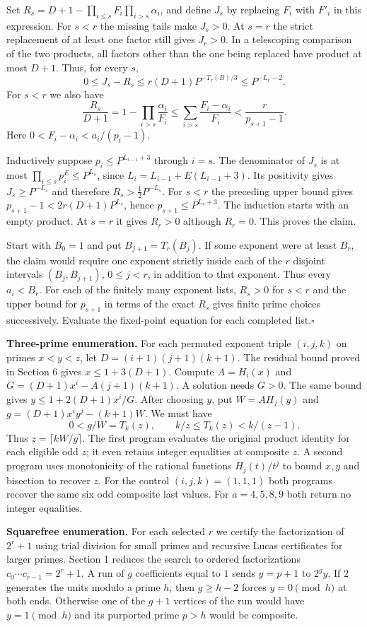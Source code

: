 \documentclass[12pt,letterpaper]{article}
\newcommand{\hd}[1]{\par\vspace{3pt}{\large\sffamily\bfseries\color{teal} #1}\par}
\newcommand{\thm}[1]{\textbf{\color{ink}#1.}\enspace}
\newcommand{\qedx}{\hfill\(\square\)}
\begin{document}
Set $R_s=D+1-\prod_{i\le s}F_i\prod_{i>s}\alpha_i$, and define $J_s$ by replacing $F_i$ with $F'_i$ in this expression. For $s<r$ the missing tails make $J_s>0$. At $s=r$ the strict replacement of at least one factor still gives $J_r>0$. In a telescoping comparison of the two products, all factors other than the one being replaced have product at most $D+1$. Thus, for every $s$,
\[
0\le J_s-R_s\le r(D+1)P^{-T_r(B)/3}\le P^{-L_r-2}.
\]
For $s<r$ we also have
\[
\frac{R_s}{D+1}=1-\prod_{i>s}\frac{\alpha_i}{F_i}
\le\sum_{i>s}\frac{F_i-\alpha_i}{F_i}<\frac{r}{p_{s+1}-1}.
\]
Here $0<F_i-\alpha_i<a_i/(p_i-1)$.

Inductively suppose $p_i\le P^{L_{i-1}+3}$ through $i=s$. The denominator of $J_s$ is at most $\prod_{i\le s}p_i^E\le P^{L_s}$, since $L_i=L_{i-1}+E(L_{i-1}+3)$. Its positivity gives $J_s\ge P^{-L_s}$ and therefore $R_s>\frac12P^{-L_s}$. For $s<r$ the preceding upper bound gives $p_{s+1}-1<2r(D+1)P^{L_s}$, hence $p_{s+1}\le P^{L_s+3}$. The induction starts with an empty product. At $s=r$ it gives $R_r>0$ although $R_r=0$. This proves the claim.

Start with $B_0=1$ and put $B_{j+1}=T_r(B_j)$. If some exponent were at least $B_r$, the claim would require one exponent strictly inside each of the $r$ disjoint intervals $(B_j,B_{j+1})$, $0\le j<r$, in addition to that exponent. Thus every $a_i<B_r$. For each of the finitely many exponent lists, $R_s>0$ for $s<r$ and the upper bound for $p_{s+1}$ in terms of the exact $R_s$ gives finite prime choices successively. Evaluate the fixed-point equation for each completed list.\qedx
\newpage
\hd{7\quad Reproducing the finite checks}
\thm{Three-prime enumeration} For each permuted exponent triple $(i,j,k)$ on primes $x<y<z$, let $D=(i+1)(j+1)(k+1)$. The residual bound proved in Section 6 gives $x\le1+3(D+1)$. Compute $A=H_i(x)$ and $G=(D+1)x^i-A(j+1)(k+1)$. A solution needs $G>0$. The same bound gives $y\le1+2(D+1)x^i/G$. After choosing $y$, put $W=AH_j(y)$ and $g=(D+1)x^i y^j-(k+1)W$. We must have
\[
0<g/W=T_k(z),\qquad k/z\le T_k(z)<k/(z-1).
\]
Thus $z=\lceil kW/g\rceil$. The first program evaluates the original product identity for each eligible odd $z$; it even retains integer equalities at composite $z$. A second program uses monotonicity of the rational functions $H_j(t)/t^j$ to bound $x,y$ and bisection to recover $z$. For the control $(i,j,k)=(1,1,1)$ both programs recover the same six odd composite last values. For $a=4,5,8,9$ both return no integer equalities.

\thm{Squarefree enumeration} For each selected $r$ we certify the factorization of $2^r+1$ using trial division for small primes and recursive Lucas certificates for larger primes. Section 1 reduces the search to ordered factorizations $c_0\cdots c_{r-1}=2^r+1$. A run of $g$ coefficients equal to $1$ sends $y=p+1$ to $2^g y$. If $2$ generates the units modulo a prime $h$, then $g\ge h-2$ forces $y=0\pmod h$ at both ends. Otherwise one of the $g+1$ vertices of the run would have $y=1\pmod h$ and its purported prime $p>h$ would be composite.
\end{document}
